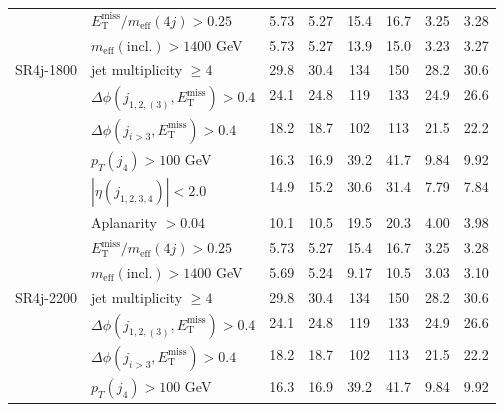 \documentclass[10pt,fleqn]{article}
\newcommand{\met}{E^\mathrm{miss}_\mathrm{T}}
\newcommand{\meff}{m_\mathrm{eff}}
\begin{document}
\begin{table}[h!]
\begin{tabular}{c|l|c|c|c|c|c|c}
             & $\met/\meff(4j) > 0.25$                         &     5.73   &   5.27    &  15.4      &   16.7    &      3.25    &   3.28         \\    
             & $\meff(\mathrm{incl.}) > 1400$ GeV              &     5.73   &   5.27    &  13.9      &   15.0    &      3.23    &   3.27         \\ \midrule           
SR4j-1800    & jet multiplicity $\geq 4$                       &     29.8   &   30.4    &  134       &   150     &      28.2    &   30.6         \\
             & $\Delta\phi(j_{1,2,(3)},\met) > 0.4$            &     24.1   &   24.8    &  119       &   133     &      24.9    &   26.6         \\
             & $\Delta\phi(j_{i>3},\met) > 0.4$                &     18.2   &   18.7    &  102       &   113     &      21.5    &   22.2         \\
             & $p_T(j_4) > 100$ GeV                            &     16.3   &   16.9    &  39.2      &   41.7    &      9.84    &   9.92         \\      
             & $|\eta(j_{1,2,3,4})|< 2.0$                      &     14.9   &   15.2    &  30.6      &   31.4    &      7.79    &   7.84         \\           
             & Aplanarity $> 0.04$                             &     10.1   &   10.5    &  19.5      &   20.3    &      4.00    &   3.98         \\           
             & $\met/\meff(4j) > 0.25$                         &     5.73   &   5.27    &  15.4      &   16.7    &      3.25    &   3.28         \\    
             & $\meff(\mathrm{incl.}) > 1400$ GeV              &     5.69   &   5.24    &  9.17      &   10.5    &      3.03    &   3.10         \\ \midrule     
SR4j-2200    & jet multiplicity $\geq 4$                       &     29.8   &   30.4    &  134       &   150     &      28.2    &   30.6         \\
             & $\Delta\phi(j_{1,2,(3)},\met) > 0.4$            &     24.1   &   24.8    &  119       &   133     &      24.9    &   26.6         \\
             & $\Delta\phi(j_{i>3},\met) > 0.4$                &     18.2   &   18.7    &  102       &   113     &      21.5    &   22.2         \\
             & $p_T(j_4) > 100$ GeV                            &     16.3   &   16.9    &  39.2      &   41.7    &      9.84    &   9.92         \\      

\end{tabular}
\end{table}
\end{document}
